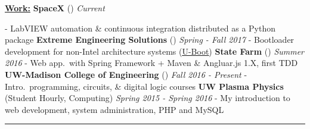 \documentclass[letterpaper,10pt]{article}
\begin{document}
\noindent
\textbf{\underline{Work:}}\hspace{5.6em}%
%
\textbf{SpaceX}
({\color{blue}\underline{}})
\textit{Current}
%
\begin{adjustwidth}{1.2in}{0in}
	{\small - LabVIEW automation \& continuous integration distributed as a Python package}
	\break
	\textbf{Extreme Engineering Solutions}
	({\color{blue}\underline{}})
	\textit{Spring - Fall 2017}
	\break
	{\small - Bootloader development for non-Intel architecture systems
		({\color{blue}\underline{\href{http://www.denx.de/wiki/U-Boot}{U-Boot}}})
	}\break
	\textbf{State Farm}
	({\color{blue}\underline{}})
	\textit{Summer 2016}
	\break
	{\small - Web app.\ with Spring Framework + Maven \& Angluar.js 1.X, first TDD}
	\break
	\textbf{UW-Madison College of Engineering}
	({\color{blue}\underline{}})
	\textit{Fall 2016 - Present}
	\break
	{\small - Intro.\ programming, circuits, \& digital logic courses}
	\break
	\textbf{UW Plasma Physics}
	(Student Hourly, Computing)
	\textit{Spring 2015 - Spring 2016}
	\break
	{\small - My introduction to web development, system administration, PHP and MySQL}
\end{adjustwidth}

{\centering\noindent\rule{7.75in}{0.5pt}}\break
\end{document}
